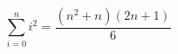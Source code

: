 \documentclass[14pt]{article}
\begin{document}
$$\sum_{i=0}^n i^2 = \frac{(n^2+n)(2n+1)}{6}$$
\end{document}
